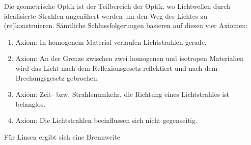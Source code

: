 
Die geometrische Optik ist der Teilbereich der Optik, wo Lichtwellen durch idealisierte Strahlen angenähert werden um den Weg des Lichtes zu (re)konstruieren. Sämtliche Schlussfolgerungen basieren auf diesen vier Axiomen:

\begin{enumerate}
	\item{Axiom:} In homogenem Material verlaufen Lichtstrahlen gerade.
	\item{Axiom:} An der Grenze zwischen zwei homogenen und isotropen Materialien wird das Licht nach dem Reflexionsgesetz reflektiert und nach dem Brechungsgesetz gebrochen.
	\item{Axiom:} Zeit- bzw. Strahlenumkehr, die Richtung eines Lichtstrahles ist belanglos.
	\item{Axiom:} Die Lichtstrahlen beeinflussen sich nicht gegenseitig.
\end{enumerate}

Für Linsen ergibt sich eine Brennweite 